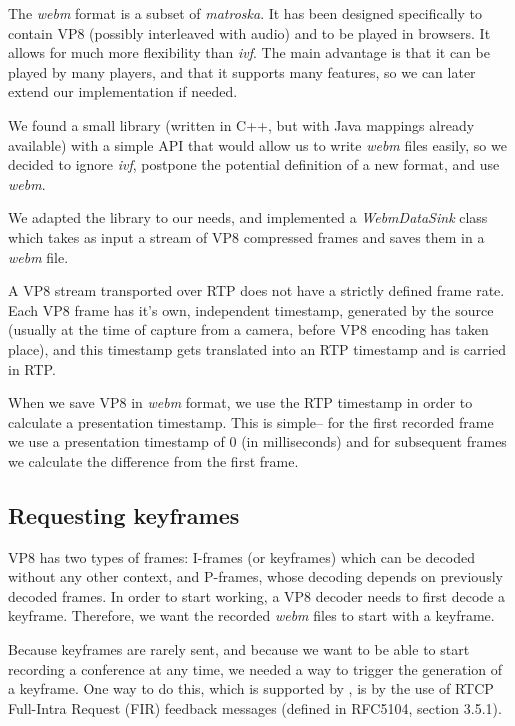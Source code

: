 \documentclass[twoside,openright,a4paper,12pt,english]{article}
\begin{document}
The \emph{webm}\cite{webm} format is a subset of
\emph{matroska}\cite{matroska}. It has been designed
specifically to contain VP8 (possibly interleaved with audio) and to be played
in browsers. It allows for much more flexibility than \emph{ivf}. The main advantage
is that it can be played by many players, and that it supports many features,
so we can later extend our implementation if needed.

\smallskip
We found a small library (written in C++, but with Java mappings already
available) with a simple API that would allow us to write \emph{webm} files
easily, so we decided to ignore \emph{ivf}, postpone the potential
definition of a new format, and use \emph{webm}. 

We adapted the library to our needs, and implemented a \emph{WebmDataSink} class which takes
as input a stream of VP8 compressed frames and saves them in a \emph{webm} file.

\medskip
A VP8 stream transported over RTP does not have a strictly defined frame rate.
Each VP8 frame has it's own, independent timestamp, generated by the source (usually at the
time of capture from a camera, before VP8 encoding has taken place), and this timestamp
gets translated into an RTP timestamp and is carried in RTP.

When we save VP8 in \emph{webm} format, we use the RTP timestamp in order to calculate
a presentation timestamp. This is simple-- for the first recorded frame we use
a presentation timestamp of 0 (in milliseconds) and for subsequent frames we
calculate the difference from the first frame.


\subsection{Requesting keyframes}
VP8 has two types of frames: I-frames (or keyframes) which can be decoded
without any other context, and P-frames, whose decoding depends on previously
decoded frames. In order to start working, a VP8 decoder needs to first decode a keyframe.
Therefore, we want the recorded \emph{webm} files to start with a keyframe.

Because keyframes are rarely sent, and because we want to be able to start
recording a conference at any time, we needed a way to trigger the generation of a
keyframe. One way to do this, which is supported by \wrtc, is by the use of
RTCP Full-Intra Request (FIR) feedback messages (defined in
RFC5104\cite{rfc5104}, section 3.5.1).
\end{document}
